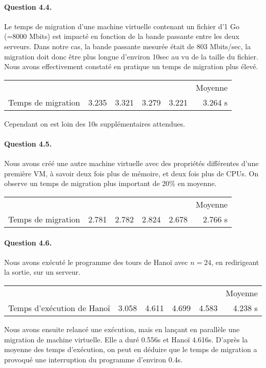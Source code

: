 \documentclass[a4paper]{article}
\begin{document}
\paragraph{Question 4.4.}
Le temps de migration d'une machine virtuelle contenant un fichier d'1 Go (=8000 Mbits) est impacté en fonction de la bande passante entre les deux serveurs.
Dans notre cas, la bande passante mesurée était de 803 Mbits/sec, la migration doit donc être plus longue d'environ 10sec au vu de la taille du fichier.
Nous avons effectivement constaté en pratique un temps de migration plus élevé.
\begin{center}
\begin{tabular}{r | r r r r | r}
\multicolumn{5}{c}{}& Moyenne\\
Temps de migration & 3.235 & 3.321 & 3.279 & 3.221 & 3.264 s
\end{tabular}
\end{center}
\noindent Cependant on est loin des 10s supplémentaires attendues.

\paragraph{Question 4.5.}
Nous avons créé une autre machine virtuelle avec des propriétés différentes d'une première VM, à savoir deux fois plus de mémoire, et deux fois plus de CPUs.
On observe un temps de migration plus important de 20\% en moyenne.
\begin{center}
\begin{tabular}{r | r r r r | r}
\multicolumn{5}{c}{}& Moyenne\\
Temps de migration & 2.781 & 2.782 & 2.824 & 2.678 & 2.766 s
\end{tabular}
\end{center}

\paragraph{Question 4.6.}
Nous avons exécuté le programme des tours de Hanoï avec \(n=24\), en redirigeant la sortie, sur un serveur.
\begin{center}
\begin{tabular}{r | r r r r | r}
\multicolumn{5}{c}{}& Moyenne\\
Temps d'exécution de Hanoï & 3.058 & 4.611 & 4.699 & 4.583 & 4.238 s
\end{tabular}
\end{center}
Nous avons ensuite relancé une exécution, mais en lançant en parallèle une migration de machine virtuelle. Elle a duré 0.556s et Hanoï 4.616s. D'après la moyenne des temps d'exécution, on peut en déduire que le temps de migration a provoqué une interruption du programme d'environ 0.4s.
\end{document}
